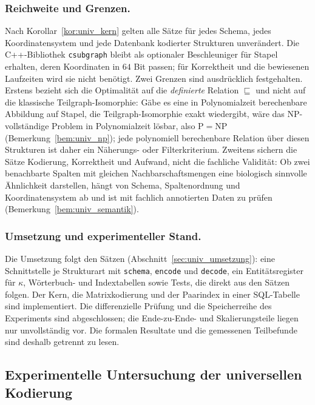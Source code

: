 \documentclass[a4paper,12pt, twoside]{report}
\theoremstyle{definition}
\begin{document}
\subsubsection{Reichweite und Grenzen.} Nach Korollar~\ref{kor:univ_kern} gelten alle Sätze für jedes Schema, jedes Koordinatensystem und jede Datenbank kodierter Strukturen unverändert. Die C++-Bibliothek \texttt{csubgraph} bleibt als optionaler Beschleuniger für Stapel erhalten, deren Koordinaten in $64$ Bit passen; für Korrektheit und die bewiesenen Laufzeiten wird sie nicht benötigt. Zwei Grenzen sind ausdrücklich festgehalten. Erstens bezieht sich die Optimalität auf die \emph{definierte} Relation $\sqsubseteq$ und nicht auf die klassische Teilgraph-Isomorphie: Gäbe es eine in Polynomialzeit berechenbare Abbildung auf Stapel, die Teilgraph-Isomorphie exakt wiedergibt, wäre das NP-vollständige Problem in Polynomialzeit lösbar, also $\mathrm{P}=\mathrm{NP}$ (Bemerkung~\ref{bem:univ_np}); jede polynomiell berechenbare Relation über diesen Strukturen ist daher ein Näherungs- oder Filterkriterium. Zweitens sichern die Sätze Kodierung, Korrektheit und Aufwand, nicht die fachliche Validität: Ob zwei benachbarte Spalten mit gleichen Nachbarschaftsmengen eine biologisch sinnvolle Ähnlichkeit darstellen, hängt von Schema, Spaltenordnung und Koordinatensystem ab und ist mit fachlich annotierten Daten zu prüfen (Bemerkung~\ref{bem:univ_semantik}).

\subsubsection{Umsetzung und experimenteller Stand.} Die Umsetzung folgt den Sätzen (Abschnitt~\ref{sec:univ_umsetzung}): eine Schnittstelle je Strukturart mit \texttt{schema}, \texttt{encode} und \texttt{decode}, ein Entitätsregister für $\kappa$, Wörterbuch- und Indextabellen sowie Tests, die direkt aus den Sätzen folgen. Der Kern, die Matrixkodierung und der Paarindex in einer SQL-Tabelle sind implementiert. Die differenzielle Prüfung und die Speicherreihe des Experiments sind abgeschlossen; die Ende-zu-Ende- und Skalierungsteile liegen nur unvollständig vor. Die formalen Resultate und die gemessenen Teilbefunde sind deshalb getrennt zu lesen.

\subsection{Experimentelle Untersuchung der universellen Kodierung}
\label{sec:zus_univ_experiment}
\end{document}
